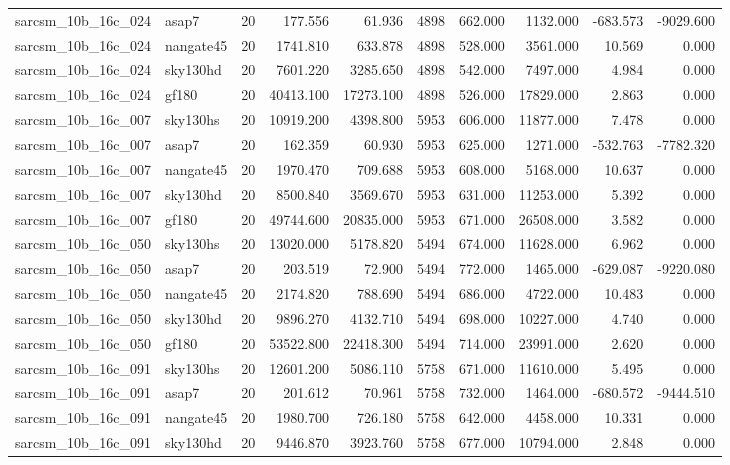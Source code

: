 \begin{tabular}{llrrrrrrrr}
sarcsm\_10b\_16c\_024 & asap7 & 20 & 177.556 & 61.936 & 4898 & 662.000 & 1132.000 & -683.573 & -9029.600 \\
sarcsm\_10b\_16c\_024 & nangate45 & 20 & 1741.810 & 633.878 & 4898 & 528.000 & 3561.000 & 10.569 & 0.000 \\
sarcsm\_10b\_16c\_024 & sky130hd & 20 & 7601.220 & 3285.650 & 4898 & 542.000 & 7497.000 & 4.984 & 0.000 \\
sarcsm\_10b\_16c\_024 & gf180 & 20 & 40413.100 & 17273.100 & 4898 & 526.000 & 17829.000 & 2.863 & 0.000 \\
sarcsm\_10b\_16c\_007 & sky130hs & 20 & 10919.200 & 4398.800 & 5953 & 606.000 & 11877.000 & 7.478 & 0.000 \\
sarcsm\_10b\_16c\_007 & asap7 & 20 & 162.359 & 60.930 & 5953 & 625.000 & 1271.000 & -532.763 & -7782.320 \\
sarcsm\_10b\_16c\_007 & nangate45 & 20 & 1970.470 & 709.688 & 5953 & 608.000 & 5168.000 & 10.637 & 0.000 \\
sarcsm\_10b\_16c\_007 & sky130hd & 20 & 8500.840 & 3569.670 & 5953 & 631.000 & 11253.000 & 5.392 & 0.000 \\
sarcsm\_10b\_16c\_007 & gf180 & 20 & 49744.600 & 20835.000 & 5953 & 671.000 & 26508.000 & 3.582 & 0.000 \\
sarcsm\_10b\_16c\_050 & sky130hs & 20 & 13020.000 & 5178.820 & 5494 & 674.000 & 11628.000 & 6.962 & 0.000 \\
sarcsm\_10b\_16c\_050 & asap7 & 20 & 203.519 & 72.900 & 5494 & 772.000 & 1465.000 & -629.087 & -9220.080 \\
sarcsm\_10b\_16c\_050 & nangate45 & 20 & 2174.820 & 788.690 & 5494 & 686.000 & 4722.000 & 10.483 & 0.000 \\
sarcsm\_10b\_16c\_050 & sky130hd & 20 & 9896.270 & 4132.710 & 5494 & 698.000 & 10227.000 & 4.740 & 0.000 \\
sarcsm\_10b\_16c\_050 & gf180 & 20 & 53522.800 & 22418.300 & 5494 & 714.000 & 23991.000 & 2.620 & 0.000 \\
sarcsm\_10b\_16c\_091 & sky130hs & 20 & 12601.200 & 5086.110 & 5758 & 671.000 & 11610.000 & 5.495 & 0.000 \\
sarcsm\_10b\_16c\_091 & asap7 & 20 & 201.612 & 70.961 & 5758 & 732.000 & 1464.000 & -680.572 & -9444.510 \\
sarcsm\_10b\_16c\_091 & nangate45 & 20 & 1980.700 & 726.180 & 5758 & 642.000 & 4458.000 & 10.331 & 0.000 \\
sarcsm\_10b\_16c\_091 & sky130hd & 20 & 9446.870 & 3923.760 & 5758 & 677.000 & 10794.000 & 2.848 & 0.000 \\

\end{tabular}
